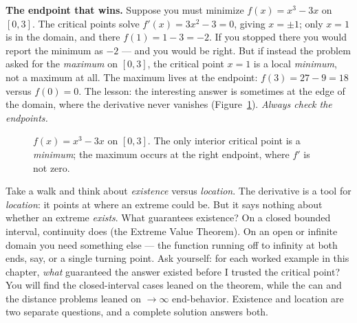 \begin{trapbox}
\textbf{The endpoint that wins.} Suppose you must minimize $f(x) = x^3 - 3x$ on
$[0, 3]$. The critical points solve $f'(x) = 3x^2 - 3 = 0$, giving $x=\pm 1$; only
$x=1$ is in the domain, and there $f(1) = 1 - 3 = -2$. If you stopped there you would
report the minimum as $-2$ --- and you would be right. But if instead the problem asked
for the \emph{maximum} on $[0,3]$, the critical point $x=1$ is a local \emph{minimum},
not a maximum at all. The maximum lives at the endpoint: $f(3) = 27 - 9 = 18$ versus
$f(0)=0$. The lesson: the interesting answer is sometimes at the edge of the domain,
where the derivative never vanishes (Figure~\ref{ch17:fig-endpoint}).
\emph{Always check the endpoints.}
\end{trapbox}

\begin{figure}[H]
\centering
{}
\caption{$f(x)=x^3-3x$ on $[0,3]$. The only interior critical point is a
\emph{minimum}; the maximum occurs at the right endpoint, where $f'$ is not zero.}
\label{ch17:fig-endpoint}
\end{figure}

\begin{walkbox}
Take a walk and think about \emph{existence} versus \emph{location}. The derivative
is a tool for \emph{location}: it points at where an extreme could be. But it says
nothing about whether an extreme \emph{exists}. What guarantees existence? On a closed
bounded interval, continuity does (the Extreme Value Theorem). On an open or infinite
domain you need something else --- the function running off to infinity at both ends,
say, or a single turning point. Ask yourself: for each worked example in this chapter,
\emph{what} guaranteed the answer existed before I trusted the critical point? You
will find the closed-interval cases leaned on the theorem, while the can and the
distance problems leaned on $\to\infty$ end-behavior. Existence and location are two
separate questions, and a complete solution answers both.
\end{walkbox}

